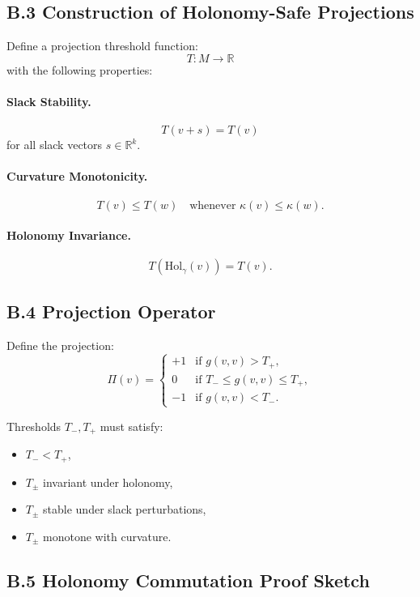 \subsection{B.3 Construction of Holonomy-Safe Projections}

Define a projection threshold function:
\[
T : M \rightarrow \mathbb{R}
\]
with the following properties:

\paragraph{Slack Stability.}
\[
T(v + s) = T(v)
\]
for all slack vectors $s \in \mathbb{R}^k$.

\paragraph{Curvature Monotonicity.}
\[
T(v) \le T(w) \quad \text{whenever } \kappa(v) \le \kappa(w).
\]

\paragraph{Holonomy Invariance.}
\[
T(\mathrm{Hol}_\gamma(v)) = T(v).
\]

\subsection{B.4 Projection Operator}

Define the projection:
\[
\Pi(v) =
\begin{cases}
+1 & \text{if } g(v,v) > T_+, \\
0  & \text{if } T_- \le g(v,v) \le T_+, \\
-1 & \text{if } g(v,v) < T_-.
\end{cases}
\]

Thresholds $T_-, T_+$ must satisfy:

\begin{itemize}
    \item $T_- < T_+$,
    \item $T_\pm$ invariant under holonomy,
    \item $T_\pm$ stable under slack perturbations,
    \item $T_\pm$ monotone with curvature.
\end{itemize}

\subsection{B.5 Holonomy Commutation Proof Sketch}

